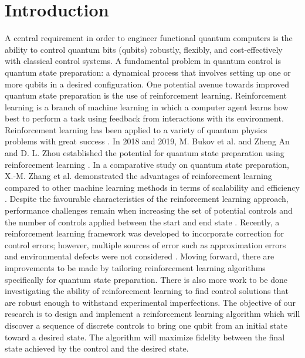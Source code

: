 \documentclass[{../RL_for_QSP.tex}]{subfiles}
\begin{document}
    \section{Introduction}
    \label{sec:INT}

A central requirement in order to engineer functional quantum computers is the ability to control quantum bits (qubits) robustly, flexibly, and cost-effectively with classical control systems. A fundamental problem in quantum control is quantum state preparation: a dynamical process that involves setting up one or more qubits in a desired configuration. One potential avenue towards improved quantum state preparation is the use of reinforcement learning. Reinforcement learning is a branch of machine learning in which a computer agent learns how best to perform a task using feedback from interactions with its environment. Reinforcement learning has been applied to a variety of quantum physics problems with great success \cite{2018zhang} \cite{fosel2018reinforcement} \cite{halverson2019branes} \cite{nautrup2019optimizing} \cite{melnikov2018active}. In 2018 and 2019, M. Bukov et al. and Zheng An and D. L. Zhou established the potential for quantum state preparation using reinforcement learning \cite{bukov2018reinforcement} \cite{an2019deep}. In a comparative study on quantum state preparation, X.-M. Zhang et al. demonstrated the advantages of reinforcement learning compared to other machine learning methods in terms of scalability and efficiency \cite{2019zhang}. Despite the favourable characteristics of the reinforcement learning approach, performance challenges remain when increasing the set of potential controls and the number of controls applied between the start and end state \cite{2019zhang}. Recently, a reinforcement learning framework was developed to incorporate correction for control errors; however, multiple sources of error such as approximation errors and environmental defects were not considered \cite{niu2019universal}. Moving forward, there are improvements to be made by tailoring reinforcement learning algorithms specifically for quantum state preparation. There is also more work to be done investigating the ability of reinforcement learning to find control solutions that are robust enough to withstand experimental imperfections. The objective of our research is to design and implement a reinforcement learning algorithm which will discover a sequence of discrete controls to bring one qubit from an initial state toward a desired state. The algorithm will maximize fidelity between the final state achieved by the control and the desired state. 
\end{document}

